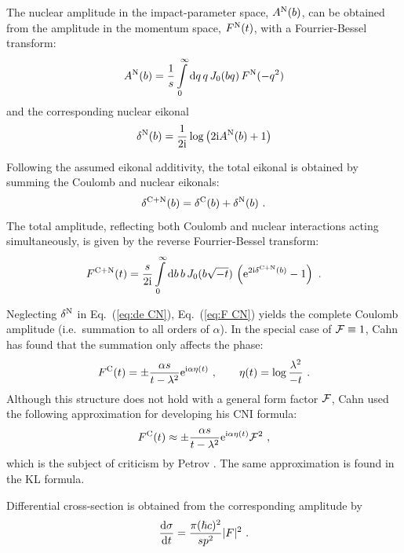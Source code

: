 \documentclass{appolb}
\def\d{{\rm d}}
\def\e{{\rm e}}
\def\I{{\rm i}}
\begin{document}
The nuclear amplitude in the impact-parameter space, $A^{\rm N}(b)$, can be obtained from the amplitude in the momentum space, $F^{\rm N}(t)$, with a Fourrier-Bessel transform:
\begin{equation}
A^{\rm N}(b) = {1\over s} \int\limits_0^\infty \d q\, q\, J_0(bq)\, F^{\rm N}(-q^2)
\label{eq:A N}
\end{equation}
and the corresponding nuclear eikonal
\begin{equation}
\delta^{\rm N}(b) = {1\over 2\I} \log\left( 2\I A^{\rm N}(b) + 1\right)
\label{eq:de N}
\end{equation}

Following the assumed eikonal additivity, the total eikonal is obtained by summing the Coulomb and nuclear eikonals:
\begin{equation}
\delta^{\rm C+N}(b) = \delta^{\rm C}(b) + \delta^{\rm N}(b)\ .
\label{eq:de CN}
\end{equation}
The total amplitude, reflecting both Coulomb and nuclear interactions acting simultaneously, is given by the reverse Fourrier-Bessel transform:
\begin{equation}
F^{\rm C+N}(t) = {s\over 2\I} \int
\limits
_0^\infty 
\d b\, b\,J_0(b\sqrt{-t})\,\left( \e^{2\I \delta^{\rm C+N}(b)} - 1 \right)\ .
\label{eq:F CN}
\end{equation}

Neglecting $\delta^{\rm N}$ in Eq.~(\ref{eq:de CN}), Eq.~(\ref{eq:F CN}) yields the complete Coulomb amplitude (i.e.~summation to all orders of $\alpha$). In the special case of ${\cal F} \equiv 1$, Cahn has found that the summation only affects the phase:
\begin{equation}
F^{\rm C}(t) = \pm {\alpha s\over t - \lambda^2} \e^{\I\alpha \eta(t)}\ ,\qquad \eta(t) = \log {\lambda^2\over -t}\ .
\label{eq:F C comp}
\end{equation}
Although this structure does not hold with a general form factor ${\cal F}$, Cahn used the following approximation for developing his CNI formula:
\begin{equation}
F^{\rm C}(t) \approx \pm {\alpha s\over t - \lambda^2} \e^{\I\alpha \eta(t)} {\cal F}^2  \ ,
\label{eq:F C comp ff}
\end{equation}
which is the subject of criticism by Petrov \cite{petrov2018}. The same approximation is found in the KL formula.

Differential cross-section is obtained from the corresponding amplitude by
\begin{equation}
{\d\sigma\over\d t} = {\pi(\hslash c)^2\over s p^2} |F|^2\ .
\label{eq:cs}
\end{equation}
\end{document}
